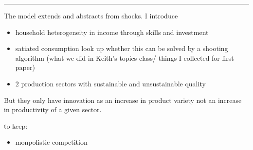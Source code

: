\vspace{5mm}
\noindent\rule[1ex]{\textwidth}{1pt}
The model extends \cite{Bilbiie2012EndogenousCycles} and abstracts from shocks. 
I introduce
\begin{itemize}
\item household heterogeneity in income through skills and investment
\item satiated consumption \ar look up whether this can be solved by a shooting algorithm (what we did in Keith's topics class/ things I collected for first paper)
\item 2 production sectors with sustainable and unsustainable quality
\end{itemize}

But they only have innovation as an increase in product variety not an increase in productivity of a given sector.

to keep:
\begin{itemize}
\item monpolistic competition
\end{itemize}

